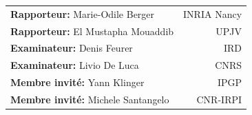\begin{titlepage}
\begin{center}
\begin{tabular}{lr}
	\textbf{Rapporteur:} Marie-Odile Berger & INRIA Nancy\\
	\textbf{Rapporteur:} El Mustapha Mouaddib & UPJV\\
	\textbf{Examinateur:} Denis Feurer & IRD\\
	\textbf{Examinateur:} Livio De Luca & CNRS\\
	\textbf{Membre invité:} Yann Klinger & IPGP\\
	\textbf{Membre invité:} Michele Santangelo & CNR-IRPI\\
\end{tabular}
\end{center}
\end{titlepage}

\sloppy

\titlepage

\restoregeometry